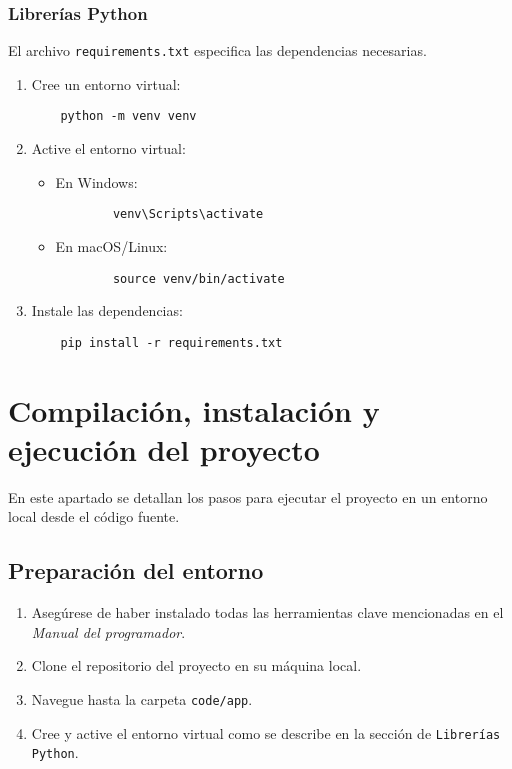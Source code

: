\subsubsection{Librerías Python}
El archivo \texttt{requirements.txt} especifica las dependencias necesarias.

\begin{enumerate}
    \item Cree un entorno virtual:
    \begin{verbatim}
    python -m venv venv
    \end{verbatim}
    \item Active el entorno virtual:
    \begin{itemize}
        \item En Windows:
        \begin{verbatim}
        venv\Scripts\activate
        \end{verbatim}
        \item En macOS/Linux:
        \begin{verbatim}
        source venv/bin/activate
        \end{verbatim}
    \end{itemize}
    \item Instale las dependencias:
    \begin{verbatim}
    pip install -r requirements.txt
    \end{verbatim}
\end{enumerate}

\section{Compilación, instalación y ejecución del proyecto}

En este apartado se detallan los pasos para ejecutar el proyecto en un entorno local desde el código fuente.

\subsection{Preparación del entorno}
\begin{enumerate}
    \item Asegúrese de haber instalado todas las herramientas clave mencionadas en el \textit{Manual del programador}.
    \item Clone el repositorio del proyecto en su máquina local.
    \item Navegue hasta la carpeta \texttt{code/app}.
    \item Cree y active el entorno virtual como se describe en la sección de \texttt{Librerías Python}.
\end{enumerate}

